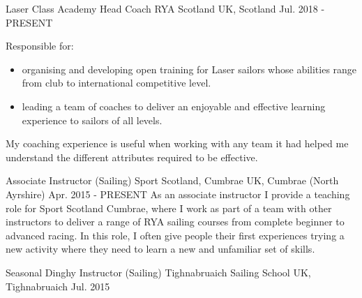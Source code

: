 \begin{cventries}
  \cventry
    {Laser Class Academy Head Coach} %
    {RYA Scotland} %
    {UK, Scotland} %
    {Jul. 2018 - PRESENT} %
    {
    Responsible for:
    \begin{itemize}
        \item organising and developing open training for Laser sailors whose abilities range from club to international competitive level.
        \item leading a team of coaches to deliver an enjoyable and effective learning experience to sailors of all levels.
    \end{itemize}
    My coaching experience is useful when working with any team it had helped me understand the different attributes required to be effective.
    }

 
  \cventry
    {Associate Instructor (Sailing)} %
    {Sport Scotland, Cumbrae} %
    {UK, Cumbrae (North Ayrshire)} %
    {Apr. 2015 - PRESENT} %
    {
      As an associate instructor I provide a teaching role for Sport Scotland Cumbrae, where I work as part of a team with other instructors to deliver a range of RYA sailing courses from complete beginner to advanced racing. In this role, I often give people their first experiences trying a new activity where they need to learn a new and unfamiliar set of skills.
    }

 \cventry
    {Seasonal Dinghy Instructor (Sailing)} %
    {Tighnabruaich Sailing School} %
    {UK, Tighnabruaich} %
    {Jul. 2015} %
    {
    }

\end{cventries}
